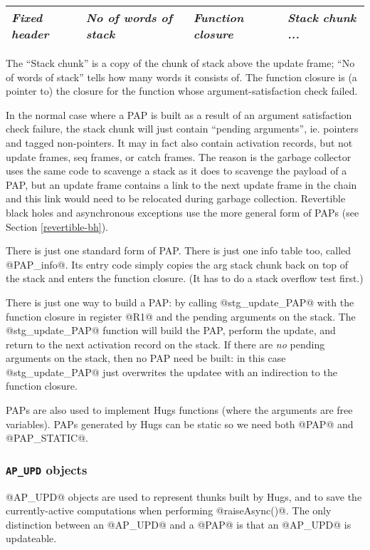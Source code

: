 \documentclass[11pt]{article}
\newcommand{\Subsubsection}[2]{\subsubsection{#1}\label{sec:#2}}
\begin{document}
\begin{center}
\begin{tabular}{|l|l|l|l|}\hline
\emph{Fixed header}  & \emph{No of words of stack} & \emph{Function closure} & \emph{Stack chunk ...} \\ \hline
\end{tabular}
\end{center}

The ``Stack chunk'' is a copy of the chunk of stack above the update
frame; ``No of words of stack'' tells how many words it consists of.
The function closure is (a pointer to) the closure for the function
whose argument-satisfaction check failed.

In the normal case where a PAP is built as a result of an argument
satisfaction check failure, the stack chunk will just contain
``pending arguments'', ie. pointers and tagged non-pointers.  It may
in fact also contain activation records, but not update frames, seq
frames, or catch frames.  The reason is the garbage collector uses the
same code to scavenge a stack as it does to scavenge the payload of a
PAP, but an update frame contains a link to the next update frame in
the chain and this link would need to be relocated during garbage
collection.  Revertible black holes and asynchronous exceptions use
the more general form of PAPs (see Section \ref{revertible-bh}).

There is just one standard form of PAP. There is just one info table
too, called @PAP_info@.  Its entry code simply copies the arg stack
chunk back on top of the stack and enters the function closure.  (It
has to do a stack overflow test first.)

There is just one way to build a PAP: by calling @stg_update_PAP@ with
the function closure in register @R1@ and the pending arguments on the
stack.  The @stg_update_PAP@ function will build the PAP, perform the
update, and return to the next activation record on the stack.  If
there are \emph{no} pending arguments on the stack, then no PAP need
be built: in this case @stg_update_PAP@ just overwrites the updatee
with an indirection to the function closure.

PAPs are also used to implement Hugs functions (where the arguments
are free variables).  PAPs generated by Hugs can be static so we need
both @PAP@ and @PAP_STATIC@.

\Subsubsection{\texttt{AP\_UPD} objects}{AP_UPD}

@AP_UPD@ objects are used to represent thunks built by Hugs, and to
save the currently-active computations when performing @raiseAsync()@.
The only
distinction between an @AP_UPD@ and a @PAP@ is that an @AP_UPD@ is
updateable.
\end{document}
